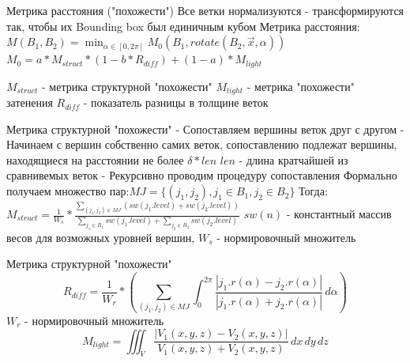 \documentclass[14pt]{beamer}
\begin{document}
\begin{frame}{Метрика расстояния ("похожести")}
Все ветки нормализуются - трансформируются так, чтобы их 
Bounding box был единичным кубом\linebreak 
Метрика расстояния:\linebreak \linebreak 
$M(B_1,B_2) = \min_{\alpha \in [0,2\pi]} M_0(B_1,rotate(B_2,\vec{x},\alpha))$
$M_0 = a*M_{struct}*(1 - b*R_{diff}) + (1 - a)*M_{light}$

$M_{struct}$ - метрика структурной "похожести"\linebreak 
$M_{light}$ - метрика "похожести" затенения\linebreak 
$R_{diff}$ - показатель разницы в толщине веток\linebreak 

\end{frame}
\begin{frame}{Метрика структурной "похожести"}
- Сопоставляем вершины веток друг с другом\linebreak 
- Начинаем с вершин собственно самих веток, сопоставлению подлежат вершины, находящиеся на расстоянии не более $\delta*len$\linebreak 
$len$ - длина кратчайшей из сравнивемых веток\linebreak 
- Рекурсивно проводим процедуру сопоставления\linebreak 
Формально получаем множество пар:\linebreak $MJ = \{(j_1,j_2), j_1 \in B_1, j_2 \in B_2\}$
  Тогда:\linebreak\linebreak
$M_{struct} = \frac{1}{W_s}*\frac{\sum_{(j_1,j_2) \in MJ} (sw(j_1.level) + sw(j_2.level))}{\sum_{j_1 \in B_1} sw(j_1.level) + \sum_{j_2 \in B_2} sw(j_2.level)}$\linebreak
$sw(n)$ - константный массив весов для возможных уровней вершин, 
$W_s$ - нормировочный множитель
\end{frame}
\begin{frame}{Метрика структурной "похожести"}
\[R_{diff} = \frac{1}{W_r}*(\sum_{(j_1,j_2) \in MJ} \int_{0}^{2\pi} \frac{|j_1.r(\alpha) - j_2.r(\alpha)|}{|j_1.r(\alpha) + j_2.r(\alpha)|} \,d\alpha)\]\linebreak
$W_r$ - нормировочный множитель
\[M_{light} = \iiint_V \frac{|V_1(x,y,z) - V_2(x,y,z)|}{V_1(x,y,z) + V_2(x,y,z)} \,dx\,dy\,dz\]
\end{frame}
\end{document}
